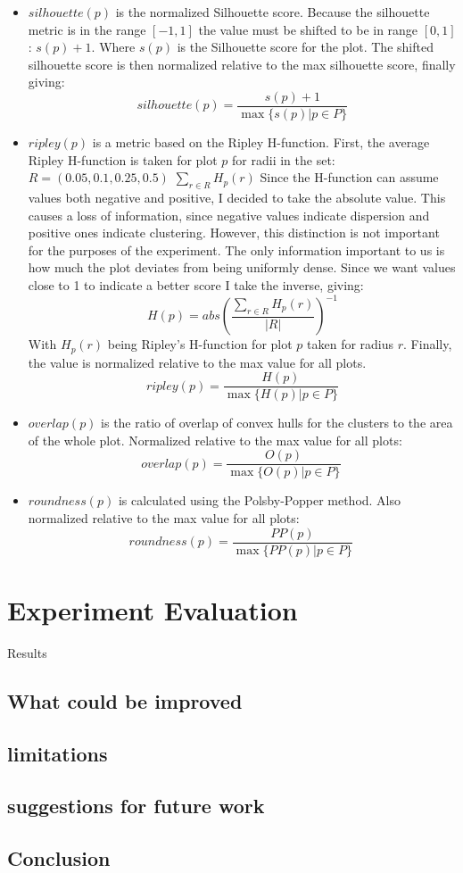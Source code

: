 \documentclass[11pt]{article}
\begin{document}
\begin{itemize}
\item \(silhouette(p)\) is the normalized Silhouette score. Because the silhouette metric is in the range \([-1, 1]\) the value must be shifted to be in range \([0, 1]\): \(s(p) + 1\). Where \(s(p)\) is the Silhouette score for the plot. The shifted silhouette score is then normalized relative to the max silhouette score, finally giving:
\[silhouette(p) = \frac{s(p) + 1}{\max\{s(p) | p \in P\}}\]
\item \(ripley(p)\) is a metric based on the Ripley H-function. First, the average Ripley H-function is taken for plot \(p\) for radii in the set: \(R = (0.05, 0.1, 0.25, 0.5)\) \(\sum_{r \in R} H_{p}(r)\) Since the H-function can assume values both negative and positive, I decided to take the absolute value. This causes a loss of information, since negative values indicate dispersion and positive ones indicate clustering. However, this distinction is not important for the purposes of the experiment. The only information important to us is how much the plot deviates from being uniformly dense. Since we want values close to 1 to indicate a better score I take the inverse, giving:
\[H(p) = abs(\frac{\sum_{r \in R} H_{p}(r)}{|R|})^{-1}\]
With \(H_{p}(r)\) being Ripley's H-function for plot \(p\) taken for radius \(r\). Finally, the value is normalized relative to the max value for all plots.
\[ ripley(p) = \frac{H(p)}{ \max \{ H(p)| p \in P \}} \]
\item \(overlap(p)\) is the ratio of overlap of convex hulls for the clusters to the area of the whole plot. Normalized relative to the max value for all plots:
\[ overlap(p) = \frac{O(p)}{ \max \{ O(p)| p \in P \}} \  \]
\item \(roundness(p)\) is calculated using the Polsby-Popper method. Also normalized relative to the max value for all plots:
\[ roundness(p) = \frac{PP(p)}{ \max \{ PP(p)| p \in P \}} \  \]
\end{itemize}

\section{Experiment Evaluation}
\label{sec:org8d9a4f0}


Results
\label{sec:org5ce221c}
\subsection{What could be improved}
\label{sec:org1054556}
\subsection{limitations}
\label{sec:org1e550a7}
\subsection{suggestions for future work}
\label{sec:org8e8f855}
\subsection{Conclusion}
\label{sec:orgf2b4e9e}



\end{document}
